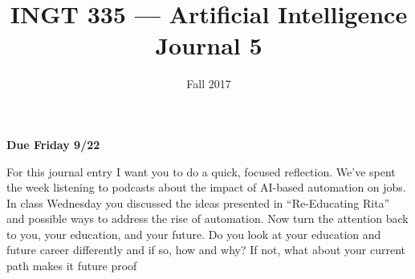 \documentclass[nobib]{tufte-handout}
\title{INGT 335 --- Artificial Intelligence \\ Journal 5}
\author{}
\date{ Fall 2017 }
\begin{document}
\maketitle

\begin{center}
  \textbf{Due Friday 9/22}
\end{center}

For this journal entry I want you to do a quick, focused reflection. We've spent the week listening to podcasts about the impact of AI-based automation on jobs.  In class Wednesday you discussed the ideas presented in ``Re-Educating Rita'' and possible ways to address the rise of automation.  Now turn the attention back to you, your education, and your future. Do you look at your education and future career differently and if so, how and why? If not, what about your current path makes it future proof
\end{document}
